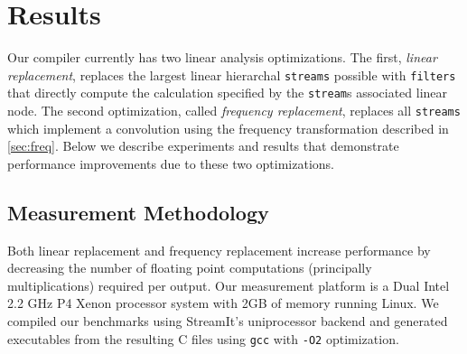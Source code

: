 \section{Results}
\label{sec:results}

Our compiler currently has two linear analysis optimizations. The first,
{\it linear replacement}, replaces the largest linear hierarchal {\tt streams} 
possible with {\tt filters} that directly compute the calculation specified by 
the {\tt stream}s associated linear node. The second optimization, called 
{\it frequency replacement}, replaces all {\tt streams} which implement 
a convolution using the frequency transformation described in 
\ref{sec:freq}. Below we describe experiments and results that demonstrate
performance improvements due to these two optimizations.


\subsection{Measurement Methodology}



Both linear replacement and frequency replacement increase performance by 
decreasing the number of floating point computations (principally multiplications) required per output.
Our measurement platform is a Dual Intel 2.2 GHz P4 Xenon processor system 
with 2GB of memory running Linux. We compiled our benchmarks using StreamIt's uniprocessor backend
and generated executables from the resulting C files using {\tt gcc} with {\tt -O2} optimization.

